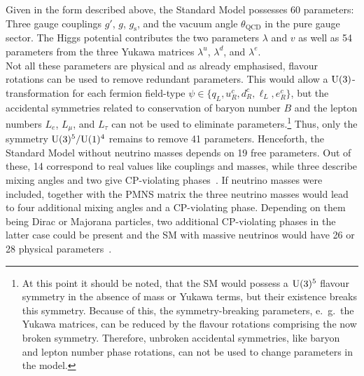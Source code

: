\noindent Given in the form described above, the Standard Model possesses 60 parameters:
Three gauge couplings $g'$, $g$, $g_\mathrm{s}$, and the vacuum angle $\theta_\mathrm{QCD}$ in the pure gauge sector. The Higgs potential contributes the two parameters $\lambda$ and $v$ as well as 54 parameters from the three Yukawa matrices $\lambda^u$, $\lambda^d$, and $\lambda^e$.\\
Not all these parameters are physical and as already emphasised, flavour rotations can be used to remove redundant parameters. This would allow a $\mathrm{U}(3)$-transformation for each fermion field-type \mbox{$\psi\in\{q_L, u_R^c, d_R^c, \ell_L, e_R^c\}$}, but the accidental symmetries related to conservation of baryon number $B$ and the lepton numbers $L_e$, $L_\mu$, and $L_\tau$ can not be used to eliminate parameters.\footnote{At this point it should be noted, that the SM would possess a $\mathrm{U}(3)^5$ flavour symmetry in the absence of mass or Yukawa terms, but their existence breaks this symmetry. Because of this, the symmetry-breaking parameters, e.\ g.\ the Yukawa matrices, can be reduced by the flavour rotations comprising the now broken symmetry. Therefore, unbroken accidental symmetries, like baryon and lepton number phase rotations, can not be used to change parameters in the model.} Thus, only the symmetry $\mathrm{U}(3)^5/\mathrm{U}(1)^4$ remains to remove 41 parameters. Henceforth, the Standard Model without neutrino masses depends on 19 free parameters. Out of these, 14 correspond to real values like couplings and masses, while three describe mixing angles and two give CP-violating phases~\cite{arthur, pdg}.
If neutrino masses were included, together with the PMNS matrix the three neutrino masses would lead to four additional mixing angles and a CP-violating phase. Depending on them being Dirac or Majorana particles, two additional CP-violating phases in the latter case could be present and the SM with massive neutrinos would have 26 or 28 physical parameters~\cite{pdg}.

